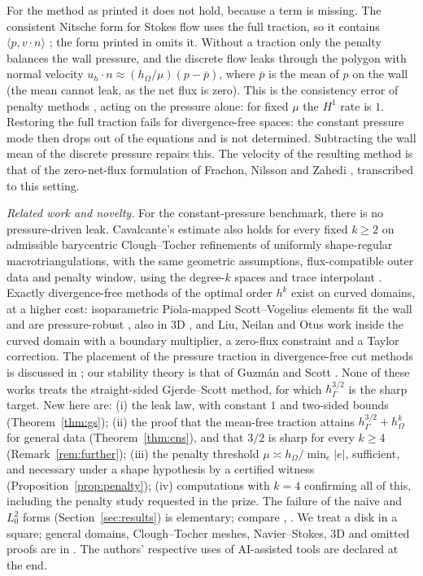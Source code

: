 \documentclass[5p,times]{elsarticle}
\theoremstyle{definition}
\newcommand{\hG}{h_\Gamma}
\newcommand{\hO}{h_\Omega}
\newcommand{\pbar}{\bar p}
\newcommand{\ip}[2]{\langle #1,#2\rangle}
\begin{document}
For the method as printed it does not hold, because a term is missing. The consistent Nitsche form for Stokes flow uses the full traction, so it contains $\ip{p}{v\cdot n}$ \cite{BurmanHansbo2014,BurmanHansboLarson2019Stokes}; the form printed in \cite[(27)--(28)]{GjerdeScott2024} omits it. Without a traction only the penalty balances the wall pressure, and the discrete flow leaks through the polygon with normal velocity $u_h\cdot n\approx(\hO/\mu)(p-\pbar)$, where $\pbar$ is the mean of $p$ on the wall (the mean cannot leak, as the net flux is zero). This is the consistency error of penalty methods \cite{Babuska1973}, acting on the pressure alone: for fixed $\mu$ the $H^1$ rate is $1$. Restoring the full traction fails for divergence-free spaces: the constant pressure mode then drops out of the equations and is not determined. Subtracting the wall mean of the discrete pressure repairs this. The velocity of the resulting method is that of the zero-net-flux formulation of Frachon, Nilsson and Zahedi \cite[\S5.1]{FrachonNilssonZahedi2024}, transcribed to this setting.

\emph{Related work and novelty.} For the constant-pressure benchmark, there is no pressure-driven leak. Cavalcante's estimate also holds for every fixed $k\ge2$ on admissible barycentric Clough--Tocher refinements of uniformly shape-regular macrotriangulations, with the same geometric assumptions, flux-compatible outer data and penalty window, using the degree-$k$ spaces and trace interpolant \cite[Corollary~5.3]{Cavalcante2026}.
 Exactly divergence-free methods of the optimal order $h^k$ exist on curved domains, at a higher cost: isoparametric Piola-mapped Scott--Vogelius elements fit the wall and are pressure-robust \cite[Theorem~6.1]{NeilanOtus2021}, also in 3D \cite{ChenLiu2026}, and Liu, Neilan and Otus \cite{LiuNeilanOtus2023} work inside the curved domain with a boundary multiplier, a zero-flux constraint and a Taylor correction. The placement of the pressure traction in divergence-free cut methods is discussed in \cite{LiuNeilanOlshanskii2023,FrachonNilssonZahedi2024}; our stability theory is that of Guzm\'an and Scott \cite{GuzmanScott2019}. None of these works treats the straight-sided Gjerde--Scott method, for which $\hG^{3/2}$ is the sharp target. New here are: (i) the leak law, with constant $1$ and two-sided bounds (Theorem~\ref{thm:gs}); (ii) the proof that the mean-free traction attains $\hG^{3/2}+\hO^k$ for general data (Theorem~\ref{thm:cns}), and that $3/2$ is sharp for every $k\ge4$ (Remark~\ref{rem:further}); (iii) the penalty threshold $\mu\asymp\hO/\min_e|e|$, sufficient, and necessary under a shape hypothesis by a certified witness (Proposition~\ref{prop:penalty}); (iv) computations with $k=4$ confirming all of this, including the penalty study requested in the prize. The failure of the naive and $L^2_0$ forms (Section~\ref{sec:results}) is elementary; compare \cite[(5.7)--(5.9)]{FrachonNilssonZahedi2024}, \cite[Remark~3.2]{LiuNeilanOtus2023}. We treat a disk in a square; general domains, Clough--Tocher meshes, Navier--Stokes, 3D and omitted proofs are in \cite{PadhiExt}. The authors' respective uses of AI-assisted tools are declared at the end.
\end{document}
